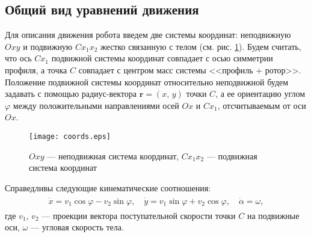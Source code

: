 	
	
	
	

\subsection{Общий вид уравнений движения}



Для описания движения робота введем две системы координат: неподвижную $Oxy$ и подвижную $Cx_1x_2$ жестко связанную с телом (см. рис. \ref{fig.coords}). Будем считать, что ось $Cx_1$ подвижной системы координат совпадает с осью симметрии профиля, а точка $C$ совпадает с центром масс системы <<профиль + ротор>>. Положение подвижной системы координат относительно неподвижной будем задавать с помощью радиус-вектора $\bm r = (x,\, y)$ точки $C$, а ее ориентацию углом $\varphi$ между положительными направлениями осей $Ox$ и $Cx_1$, отсчитываемым от оси $Ox$.

\begin{figure}[h!]
	\centering
	\texttt{[image: coords.eps]}
	\caption{$Oxy$ --- неподвижная система координат, $Cx_1x_2$ --- подвижная система координат}\label{fig.coords}
\end{figure}

Справедливы следующие кинематические соотношения:
\begin{gather}
\begin{gathered}
\dot{x} = v_1 \cos\varphi - v_2 \sin\varphi,\quad \dot{y} = v_1 \sin\varphi + v_2 \cos\varphi,\quad \dot{\alpha} = \omega,
\end{gathered}\label{eq.kinem}
\end{gather}
где $v_1$, $v_2$ --- проекции вектора поступательной скорости точки $C$ на подвижные оси, $\omega$ --- угловая скорость тела.

